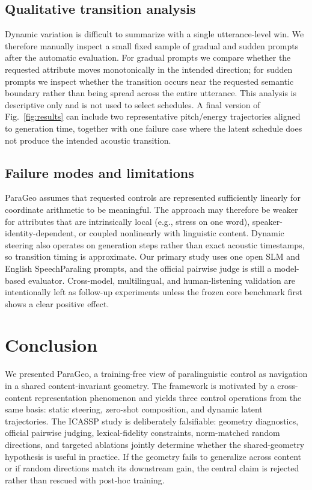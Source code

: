 \documentclass{article}
\begin{document}
\subsection{Qualitative transition analysis}
Dynamic variation is difficult to summarize with a single utterance-level win. We therefore manually inspect a small fixed sample of gradual and sudden prompts after the automatic evaluation. For gradual prompts we compare whether the requested attribute moves monotonically in the intended direction; for sudden prompts we inspect whether the transition occurs near the requested semantic boundary rather than being spread across the entire utterance. This analysis is descriptive only and is not used to select schedules. A final version of Fig.~\ref{fig:results} can include two representative pitch/energy trajectories aligned to generation time, together with one failure case where the latent schedule does not produce the intended acoustic transition.

\subsection{Failure modes and limitations}
ParaGeo assumes that requested controls are represented sufficiently linearly for coordinate arithmetic to be meaningful. The approach may therefore be weaker for attributes that are intrinsically local (e.g., stress on one word), speaker-identity-dependent, or coupled nonlinearly with linguistic content. Dynamic steering also operates on generation steps rather than exact acoustic timestamps, so transition timing is approximate. Our primary study uses one open SLM and English SpeechParaling prompts, and the official pairwise judge is still a model-based evaluator. Cross-model, multilingual, and human-listening validation are intentionally left as follow-up experiments unless the frozen core benchmark first shows a clear positive effect.

\section{Conclusion}
We presented ParaGeo, a training-free view of paralinguistic control as navigation in a shared content-invariant geometry. The framework is motivated by a cross-content representation phenomenon and yields three control operations from the same basis: static steering, zero-shot composition, and dynamic latent trajectories. The ICASSP study is deliberately falsifiable: geometry diagnostics, official pairwise judging, lexical-fidelity constraints, norm-matched random directions, and targeted ablations jointly determine whether the shared-geometry hypothesis is useful in practice. If the geometry fails to generalize across content or if random directions match its downstream gain, the central claim is rejected rather than rescued with post-hoc training.
\end{document}
